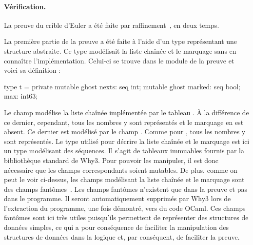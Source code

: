 \documentclass[a4paper]{easychair}
\begin{document}
\paragraph{Vérification.}



La preuve du crible d'Euler a été faite par
raffinement~\cite{paskevich20isola}, en deux temps.

La première partie de la preuve a été faite à l'aide d'un type 
représentant une structure abstraite.
Ce type modélisait la liste chaînée et le marquage sans en connaître
l'implémentation. Celui-ci se trouve dans le module 
de la preuve et voici sa définition :
\begin{why3}
type t = private {
  mutable ghost nexts: seq int;
  mutable ghost marked: seq bool;
  max: int63;
}
\end{why3}
Le champ  modélise la liste chaînée implémentée par le
tableau . À la différence de ce dernier, cependant, tous les
nombres y sont représentés et le marquage en est absent.
Ce dernier est modélisé par le champ . Comme pour ,
tous les nombres y sont représentés.
Le type  utilisé pour décrire la liste chaînée et le marquage
est ici un type modélisant des séquences.
Il s'agit de tableaux immuables fournis par la bibliothèque standard
de Why3. Pour pouvoir les manipuler, il est donc nécessaire que les champs
correspondants soient mutables.
De plus, comme on peut le voir ci-dessus, les champs modélisant la liste
chaînée et le marquage sont des champs fantômes~\cite{ghost-code}.
Les champs fantômes n'existent que dans la preuve et pas dans
le programme. Il seront automatiquement supprimés par Why3 lors
de l'extraction du programme, une fois démontré, vers du code OCaml.
Ces champs fantômes sont ici très utiles puisqu'ils permettent de représenter
des structures de données simples, ce qui a pour conséquence de faciliter
la manipulation des structures de données dans la logique et, par conséquent,
de faciliter la preuve.
\end{document}
